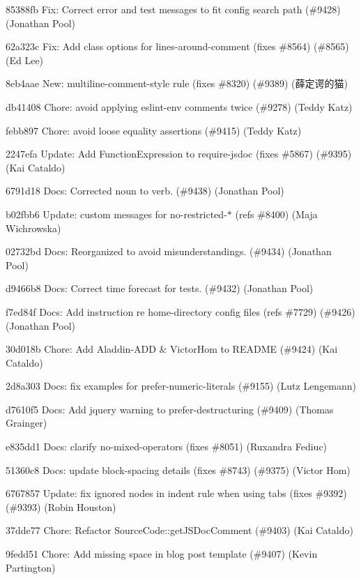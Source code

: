 \begin{DoxyItemize}
\item 85388fb Fix\+: Correct error and test messages to fit config search path (\#9428) (Jonathan Pool)
\item 62a323c Fix\+: Add class options for {\ttfamily lines-\/around-\/comment} (fixes \#8564) (\#8565) (Ed Lee)
\item 8eb4aae New\+: multiline-\/comment-\/style rule (fixes \#8320) (\#9389) (薛定谔的猫)
\item db41408 Chore\+: avoid applying eslint-\/env comments twice (\#9278) (Teddy Katz)
\item febb897 Chore\+: avoid loose equality assertions (\#9415) (Teddy Katz)
\item 2247efa Update\+: Add Function\+Expression to require-\/jsdoc (fixes \#5867) (\#9395) (Kai Cataldo)
\item 6791d18 Docs\+: Corrected noun to verb. (\#9438) (Jonathan Pool)
\item b02fbb6 Update\+: custom messages for no-\/restricted-\/$\ast$ (refs \#8400) (Maja Wichrowska)
\item 02732bd Docs\+: Reorganized to avoid misunderstandings. (\#9434) (Jonathan Pool)
\item d9466b8 Docs\+: Correct time forecast for tests. (\#9432) (Jonathan Pool)
\item f7ed84f Docs\+: Add instruction re home-\/directory config files (refs \#7729) (\#9426) (Jonathan Pool)
\item 30d018b Chore\+: Add Aladdin-\/\+A\+DD \& Victor\+Hom to R\+E\+A\+D\+ME (\#9424) (Kai Cataldo)
\item 2d8a303 Docs\+: fix examples for prefer-\/numeric-\/literals (\#9155) (Lutz Lengemann)
\item d7610f5 Docs\+: Add jquery warning to prefer-\/destructuring (\#9409) (Thomas Grainger)
\item e835dd1 Docs\+: clarify no-\/mixed-\/operators (fixes \#8051) (Ruxandra Fediuc)
\item 51360c8 Docs\+: update block-\/spacing details (fixes \#8743) (\#9375) (Victor Hom)
\item 6767857 Update\+: fix ignored nodes in indent rule when using tabs (fixes \#9392) (\#9393) (Robin Houston)
\item 37dde77 Chore\+: Refactor Source\+Code\+::get\+J\+S\+Doc\+Comment (\#9403) (Kai Cataldo)
\item 9fedd51 Chore\+: Add missing space in blog post template (\#9407) (Kevin Partington)

\end{DoxyItemize}
